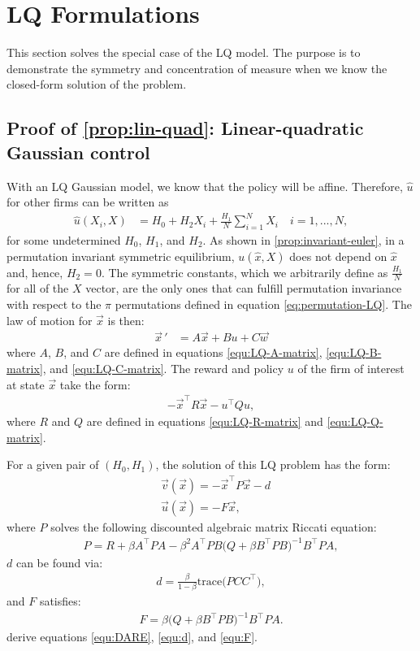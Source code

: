 \documentclass[12pt]{article}
\begin{document}
\section{LQ Formulations}
	
This section solves the special case of the LQ model.  The purpose is to demonstrate the symmetry and concentration of measure when we know the closed-form solution of the problem.

\subsection{Proof of \cref{prop:lin-quad}: Linear-quadratic Gaussian control}\label{sec:lin-quad-proof}

\noindent With an LQ Gaussian model, we know that the policy will be affine. Therefore, $\hat{u}$ for other firms can be written as 
\begin{align}
\hat{u}(X_i,X) &= H_0 +  H_2 X_i + \frac{H_1}{N}\sum_{i=1}^N X_i \quad i = 1,...,N,
\end{align}
for some undetermined $H_0$, $H_1$, and $H_2$. As shown in \cref{prop:invariant-euler}, in a permutation invariant symmetric equilibrium, $u(\hat{x},X)$ does not depend on $\hat{x}$ and, hence, $H_2 = 0$. The symmetric constants, which we arbitrarily define as $\frac{H_1}{N}$ for all of the $X$ vector, are the only ones that can fulfill permutation invariance with respect to the $\pi$ permutations defined in equation \cref{eq:permutation-LQ}. The law of motion for $\vec{x}$ is then:
\begin{align}
\vec{x}\,' &= A \vec{x} + B u + C \vec{w}
\end{align}
where $A$, $B$, and $C$ are defined in equations \cref{equ:LQ-A-matrix}, \cref{equ:LQ-B-matrix}, and \cref{equ:LQ-C-matrix}. The reward and policy $u$ of the firm of interest at state $\vec{x}$ take the form:
\begin{align}
-\vec{x}^\top R\vec{x}- u^\top Q u,
\end{align}
where $R$ and $Q$ are defined in equations \cref{equ:LQ-R-matrix} and \cref{equ:LQ-Q-matrix}.

For a given pair of $(H_0,H_1)$, the solution of this LQ problem has the form:
\begin{align}
& \vec{v}(\vec{x}) = - \vec{x}^\top P \vec{x}-d\\
& \vec{u}(\vec{x}) = -F\vec{x},
\end{align}
where $P$ solves the following  discounted algebraic matrix Riccati equation:
\begin{align}
\label{equ:DARE}
P = R + \beta A^\top P A - \beta^2 A^\top P B\big(Q+\beta B^\top P B\big)^{-1} B^\top P A,
\end{align}
$d$ can be found via:
\begin{align}
\label{equ:d}
d = \frac{\beta}{1-\beta} \text{trace}\big(PCC^\top\big),
\end{align}
and $F$ satisfies:
\begin{align}
\label{equ:F}
F = \beta \big(Q+\beta B^\top P B\big)^{-1}B^\top P A.
\end{align}
\citet[ch. 5]{LjungqvistSargent2018} derive equations \cref{equ:DARE}, \cref{equ:d}, and \cref{equ:F}.
\end{document}
